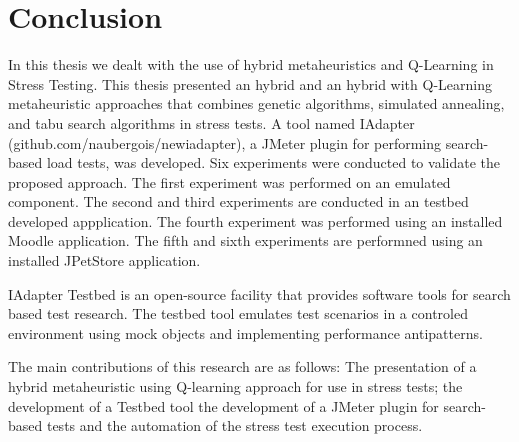 \documentclass{report}
\begin{document}








%
%
%
\chapter{Conclusion}

In this thesis we dealt with the use of hybrid metaheuristics and Q-Learning in Stress Testing. This thesis presented an hybrid and an hybrid with Q-Learning metaheuristic approaches that combines genetic algorithms, simulated annealing, and tabu search algorithms in stress tests. A tool named IAdapter (github.com/naubergois/newiadapter), a JMeter plugin for performing search-based load tests, was developed. Six experiments were conducted to validate the proposed approach. The first experiment was performed on an emulated component. The second and third experiments are conducted in an testbed developed appplication. The fourth  experiment was performed using an installed Moodle application. The fifth and sixth experiments are performned using an installed JPetStore application.

IAdapter Testbed is an open-source facility that provides software tools for search based test research. The testbed tool emulates test scenarios in a controled environment using mock objects and implementing performance antipatterns.

The main contributions of this research are as follows: The presentation of a hybrid metaheuristic using Q-learning  approach for use in stress tests; the development of a Testbed tool the development of a JMeter plugin  for search-based tests and  the automation of the stress test execution process.
\end{document}
